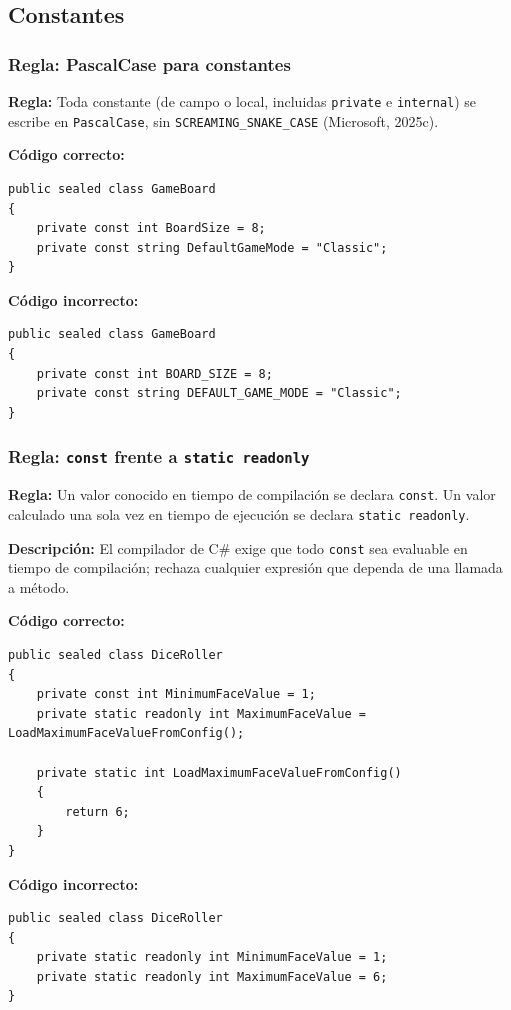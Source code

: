 \subsection{Constantes}

\subsubsection{Regla: PascalCase para constantes}

\textbf{Regla:} Toda constante (de campo o local, incluidas \texttt{private} e \texttt{internal}) se escribe en \texttt{PascalCase}, sin \texttt{SCREAMING\_SNAKE\_CASE} (Microsoft, 2025c).

\textbf{Código correcto:}
\begin{lstlisting}[style=csharpstyle]
public sealed class GameBoard
{
    private const int BoardSize = 8;
    private const string DefaultGameMode = "Classic";
}
\end{lstlisting}

\textbf{Código incorrecto:}
\begin{lstlisting}[style=csharpstyle]
public sealed class GameBoard
{
    private const int BOARD_SIZE = 8;
    private const string DEFAULT_GAME_MODE = "Classic";
}
\end{lstlisting}

\subsubsection{Regla: \texttt{const} frente a \texttt{static readonly}}

\textbf{Regla:} Un valor conocido en tiempo de compilación se declara \texttt{const}. Un valor calculado una sola vez en tiempo de ejecución se declara \texttt{static readonly}.

\textbf{Descripción:} El compilador de C\# exige que todo \texttt{const} sea evaluable en tiempo de compilación; rechaza cualquier expresión que dependa de una llamada a método.

\textbf{Código correcto:}
\begin{lstlisting}[style=csharpstyle]
public sealed class DiceRoller
{
    private const int MinimumFaceValue = 1;
    private static readonly int MaximumFaceValue = LoadMaximumFaceValueFromConfig();

    private static int LoadMaximumFaceValueFromConfig()
    {
        return 6;
    }
}
\end{lstlisting}

\textbf{Código incorrecto:}
\begin{lstlisting}[style=csharpstyle]
public sealed class DiceRoller
{
    private static readonly int MinimumFaceValue = 1;
    private static readonly int MaximumFaceValue = 6;
}
\end{lstlisting}
